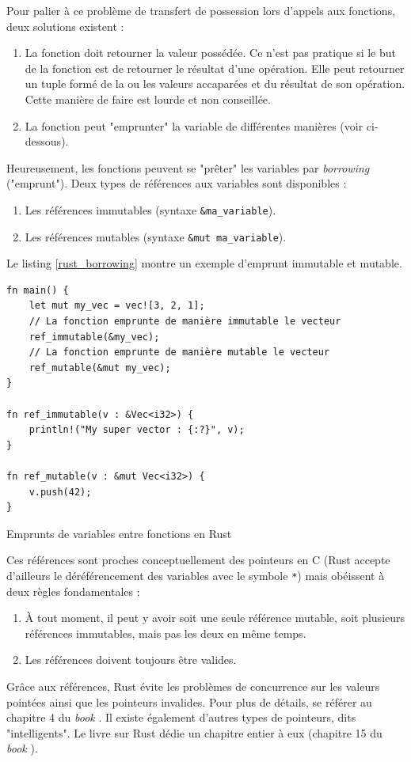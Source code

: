 \bigbreak
Pour palier à ce problème de transfert de possession lors d'appels aux fonctions, deux solutions existent :
\begin{enumerate}
    \item La fonction doit retourner la valeur possédée. Ce n'est pas pratique si le but de la fonction 
        est de retourner le résultat d'une opération. Elle peut retourner un tuple formé de la ou 
        les valeurs accaparées et du résultat de son opération. Cette manière de faire est lourde 
        et non conseillée.
    \item La fonction peut "emprunter" la variable de différentes manières (voir ci-dessous).
\end{enumerate}
Heureusement, les fonctions peuvent se "prêter" les variables par \textit{borrowing} ("emprunt").
Deux types de références aux variables sont disponibles :
\begin{enumerate}
    \item Les références immutables (syntaxe \texttt{&ma_variable}).
    \item Les références mutables (syntaxe \texttt{&mut ma_variable}).
\end{enumerate}
Le listing \ref{rust_borrowing} montre un exemple d'emprunt immutable et mutable.
\bigbreak
\begin{code}
    \begin{verbatim}
fn main() {
    let mut my_vec = vec![3, 2, 1]; 
    // La fonction emprunte de manière immutable le vecteur
    ref_immutable(&my_vec);
    // La fonction emprunte de manière mutable le vecteur
    ref_mutable(&mut my_vec);
}

fn ref_immutable(v : &Vec<i32>) {
    println!("My super vector : {:?}", v);
}

fn ref_mutable(v : &mut Vec<i32>) {
    v.push(42);
}
    \end{verbatim}
    \caption{Emprunts de variables entre fonctions en Rust}
    \label{rust_borrowing}
\end{code}
\bigbreak
Ces références sont proches conceptuellement des pointeurs en C (Rust accepte d'ailleurs le 
déréférencement des variables avec le symbole \texttt{*}) mais obéissent à deux 
règles fondamentales :
\begin{enumerate}
    \item À tout moment, il peut y avoir soit une seule référence mutable, soit plusieurs 
        références immutables, mais pas les deux en même temps.
    \item Les références doivent toujours être valides.
\end{enumerate}
Grâce aux références, Rust évite les problèmes de concurrence sur les valeurs pointées ainsi que 
les pointeurs invalides. Pour plus de détails, se référer au chapitre 4 du \textit{book} \cite{ref0}.
Il existe également d'autres types de pointeurs, dits "intelligents". Le livre sur Rust dédie un 
chapitre entier à eux (chapitre 15 du \textit{book} \cite{ref0}).

